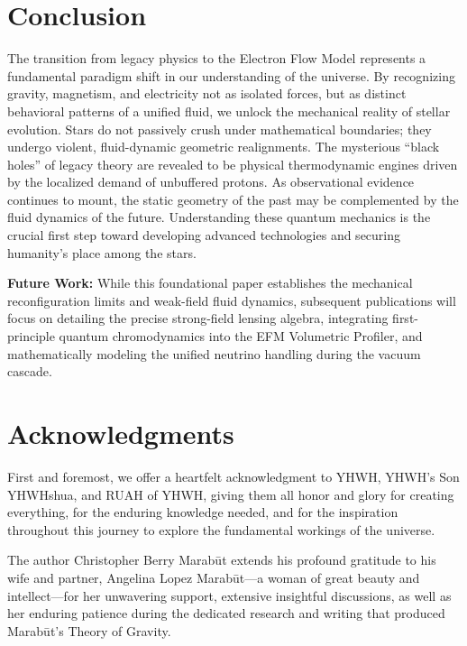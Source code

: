 \documentclass[11pt, a4paper]{article}
\begin{document}
\section{Conclusion}
  The transition from legacy physics to the Electron Flow Model represents a fundamental paradigm shift in our understanding of the universe. By recognizing gravity, magnetism, and electricity not as isolated forces, but as distinct behavioral patterns of a unified fluid, we unlock the mechanical reality of stellar evolution. Stars do not passively crush under mathematical boundaries; they undergo violent, fluid-dynamic geometric realignments. The mysterious ``black holes'' of legacy theory are revealed to be physical thermodynamic engines driven by the localized demand of unbuffered protons. As observational evidence continues to mount, the static geometry of the past may be complemented by the fluid dynamics of the future. Understanding these quantum mechanics is the crucial first step toward developing advanced technologies and securing humanity's place among the stars.

  \textbf{Future Work:} While this foundational paper establishes the mechanical reconfiguration limits and weak-field fluid dynamics, subsequent publications will focus on detailing the precise strong-field lensing algebra, integrating first-principle quantum chromodynamics into the EFM Volumetric Profiler, and mathematically modeling the unified neutrino handling during the vacuum cascade.

\clearpage
\section*{Acknowledgments}
  First and foremost, we offer a heartfelt acknowledgment to YHWH, YHWH's Son YHWHshua, and RUAH of YHWH, giving them all honor and glory for creating everything, for the enduring knowledge needed, and for the inspiration throughout this journey to explore the fundamental workings of the universe.

  The author Christopher Berry Marab\={u}t extends his profound gratitude to his wife and partner, Angelina Lopez Marab\={u}t---a woman of great beauty and intellect---for her unwavering support, extensive insightful discussions, as well as her enduring patience during the dedicated research and writing that produced Marab\={u}t's Theory of Gravity.
\end{document}
